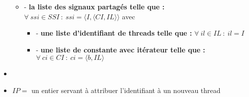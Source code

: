 \documentclass[10pt,a4paper]{report}
\begin{document}
\begin{itemize}
\begin{itemize}
			\item[] - \textbf{la liste des signaux partagés telle que :} $\forall~ssi \in SSI~:~ssi = \langle I,\langle CI,IL\rangle\rangle$ avec 
			\begin{itemize}
				\item[] - \textbf{une liste d'identifiant de threads telle que :} $\forall~il \in IL~:~il = I$
				\item[] - \textbf{une liste de constante avec itérateur telle que :} $\forall~ci \in CI~:~ci = \langle b, IL\rangle$
			\end{itemize}
		\end{itemize}
		\item[]
		\item[] $IP =$ un entier servant à attribuer l'identifiant à un nouveau thread 
	
	\end{itemize}
	\bigbreak
	
\end{document}
